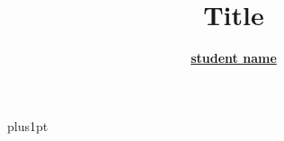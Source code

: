 \documentclass[openright,12pt]{Latex/Classes/PhDthesisPSnPDF}
\title{Title}
\author{\href{mailto:email@ul.ie}{\textbf{ student name}}}
\begin{document}




\renewcommand\baselinestretch{1.2}
\baselineskip=18pt plus1pt



\maketitle  %

\newpage
\end{document}
